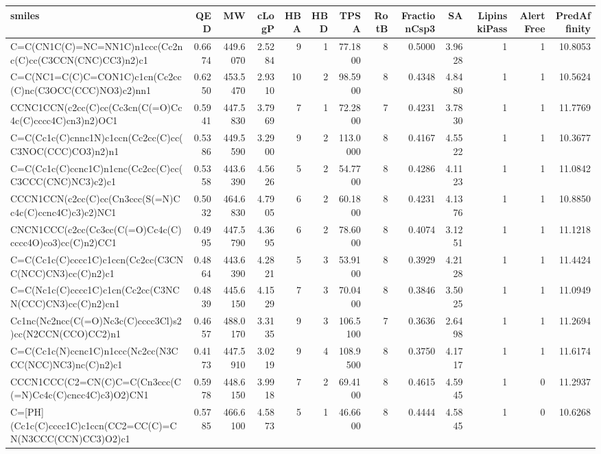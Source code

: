 \begin{tabular}{lrrrrrrrrrrrr}
\toprule
smiles & QED & MW & cLogP & HBA & HBD & TPSA & RotB & FractionCsp3 & SA & LipinskiPass & AlertFree & PredAffinity \\
\midrule
C=C(CN1C(C)=NC=NN1C)n1ccc(Cc2nc(C)cc(C3CCN(CNC)CC3)n2)c1 & 0.6674 & 449.6070 & 2.5284 & 9 & 1 & 77.1800 & 8 & 0.5000 & 3.9628 & 1 & 1 & 10.8053 \\
C=C(NC1=C(C)C=CON1C)c1cn(Cc2cc(C)nc(C3OCC(CCC)NO3)c2)nn1 & 0.6250 & 453.5470 & 2.9310 & 10 & 2 & 98.5900 & 8 & 0.4348 & 4.8480 & 1 & 1 & 10.5624 \\
CCNC1CCN(c2cc(C)cc(Cc3cn(C(=O)Cc4c(C)cccc4C)cn3)n2)OC1 & 0.5941 & 447.5830 & 3.7969 & 7 & 1 & 72.2800 & 7 & 0.4231 & 3.7830 & 1 & 1 & 11.7769 \\
C=C(Cc1c(C)cnnc1N)c1ccn(Cc2cc(C)cc(C3NOC(CCC)CO3)n2)n1 & 0.5386 & 449.5590 & 3.2900 & 9 & 2 & 113.0000 & 8 & 0.4167 & 4.5522 & 1 & 1 & 10.3677 \\
C=C(Cc1c(C)ccnc1C)n1cnc(Cc2cc(C)cc(C3CCC(CNC)NC3)c2)c1 & 0.5358 & 443.6390 & 4.5626 & 5 & 2 & 54.7700 & 8 & 0.4286 & 4.1123 & 1 & 1 & 11.0842 \\
CCCN1CCN(c2cc(C)cc(Cn3ccc(S(=N)Cc4c(C)ccnc4C)c3)c2)NC1 & 0.5032 & 464.6830 & 4.7905 & 6 & 2 & 60.1800 & 8 & 0.4231 & 4.1376 & 1 & 1 & 10.8850 \\
CNCN1CCC(c2cc(Cc3cc(C(=O)Cc4c(C)cccc4O)co3)cc(C)n2)CC1 & 0.4995 & 447.5790 & 4.3695 & 6 & 2 & 78.6000 & 8 & 0.4074 & 3.1251 & 1 & 1 & 11.1218 \\
C=C(Cc1c(C)cccc1C)c1ccn(Cc2cc(C3CNC(NCC)CN3)cc(C)n2)c1 & 0.4864 & 443.6390 & 4.2821 & 5 & 3 & 53.9100 & 8 & 0.3929 & 4.2128 & 1 & 1 & 11.4424 \\
C=C(Nc1c(C)cccc1C)c1cn(Cc2cc(C3NCN(CCC)CN3)cc(C)n2)cn1 & 0.4839 & 445.6150 & 4.1529 & 7 & 3 & 70.0400 & 8 & 0.3846 & 3.5025 & 1 & 1 & 11.0949 \\
Cc1nc(Nc2ncc(C(=O)Nc3c(C)cccc3Cl)s2)cc(N2CCN(CCO)CC2)n1 & 0.4657 & 488.0170 & 3.3135 & 9 & 3 & 106.5100 & 7 & 0.3636 & 2.6498 & 1 & 1 & 11.2694 \\
C=C(Cc1c(N)ccnc1C)n1ccc(Nc2cc(N3CCC(NCC)NC3)nc(C)n2)c1 & 0.4173 & 447.5910 & 3.0219 & 9 & 4 & 108.9500 & 8 & 0.3750 & 4.1717 & 1 & 1 & 11.6174 \\
CCCN1CCC(C2=CN(C)C=C(Cn3ccc(C(=N)Cc4c(C)cncc4C)c3)O2)CN1 & 0.5978 & 448.6150 & 3.9918 & 7 & 2 & 69.4100 & 8 & 0.4615 & 4.5945 & 1 & 0 & 11.2937 \\
C=[PH](Cc1c(C)cccc1C)c1ccn(CC2=CC(C)=CN(N3CCC(CCN)CC3)O2)c1 & 0.5785 & 466.6100 & 4.5873 & 5 & 1 & 46.6600 & 8 & 0.4444 & 4.5845 & 1 & 0 & 10.6268 \\

\end{tabular}
